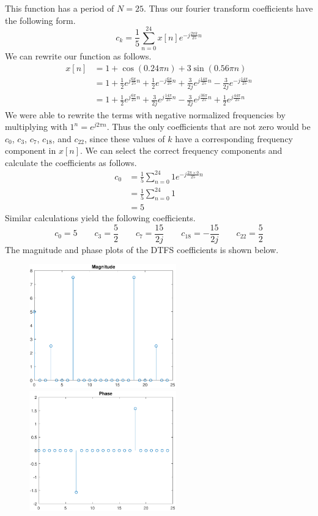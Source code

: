 \documentclass[12pt]{article}
\begin{document}
This function has a period of \(N=25\). Thus our fourier transform coefficients have the following form.
\[c_k=\frac{1}{5}\sum_{n=0}^{24}x[n] e^{-j\frac{2\pi k}{25}n}\]
We can rewrite our function as follows.
\begin{align*}
    x[n] &= 1+\cos(0.24\pi n)+3\sin(0.56\pi n)\\
    &=1+\frac{1}{2}e^{j\frac{6\pi}{25}n}+\frac{1}{2}e^{-j\frac{6\pi}{25}n}+\frac{3}{2j}e^{j\frac{14\pi}{25}n}-\frac{3}{2j}e^{-j\frac{14\pi}{25}n}\\
    &=1+\frac{1}{2}e^{j\frac{6\pi}{25}n}+\frac{3}{2j}e^{j\frac{14\pi}{25}n}-\frac{3}{2j}e^{j\frac{36\pi}{25}n}+\frac{1}{2}e^{j\frac{44\pi}{25}n}
\end{align*}
We were able to rewrite the terms with negative normalized frequencies by multiplying with \(1^n=e^{j2\pi n}\).
Thus the only coefficients that are not zero would be \(c_0\), \(c_3\), \(c_7\), \(c_{18}\), and \(c_{22}\), since
these values of \(k\) have a corresponding frequency component in \(x[n]\). We can select the correct
frequency components and calculate the coefficients as follows.
\begin{align*}
    c_0 &= \frac{1}{5}\sum_{n=0}^{24}1e^{-j\frac{2\pi \times 0}{25}n}\\
    &=\frac{1}{5}\sum_{n=0}^{24}1\\
    &=5
\end{align*}
Similar calculations yield the following coefficients.
\[c_0=5\qquad c_3=\frac{5}{2}\qquad c_7=\frac{15}{2j}\qquad c_{18}=-\frac{15}{2j}\qquad c_{22}=\frac{5}{2}\]
The magnitude and phase plots of the DTFS coefficients is shown below.
\begin{figure}[H]
    \begin{center}
        \includegraphics[width=2.5in]{problem4-mag.pdf}
        \includegraphics[width=2.5in]{problem4-phase.pdf}
    \end{center}
\end{figure}
\end{document}
